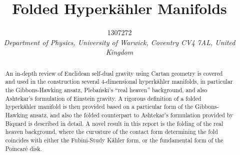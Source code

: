 \documentclass[a4paper,12pt, onecolumn, notitlepage]{article}
\theoremstyle{definition}
\theoremstyle{remark}
\newcommand{\K}{K\"ahler }
\newcommand{\HK}{hyperk\"ahler }
\begin{document}
\title{\textbf{\large{Folded Hyperk\"ahler Manifolds}}}
	
\author{\normalsize{1307272} \\
	\small\textit{
		Department of Physics, University of Warwick,
		Coventry CV4 7AL, United Kingdom}}
\date{}
\maketitle 
\vspace{-10mm}
\begin{abstract} 
\noindent
An in-depth review of Euclidean self-dual gravity using Cartan geometry is covered and used in the construction several 4-dimensional \HK manifolds, in particular the Gibbons-Hawking ansatz, Pleba\'nski's ``real heaven'' background, and also Ashtekar's formulation of Einstein gravity.
A rigorous definition of a folded \HK manifold is then provided based on a particular form of the Gibbons-Hawking ansatz, and also the folded counterpart to Ashtekar's formulation provided by Biquard is described in detail. A novel result in this report is the folding of the real heaven background, where the curvature of the contact form determining the fold coincides with either the Fubini-Study \K form, or the fundamental form of the Poincar\'e disk.
\end{abstract}
\vspace{11mm}	
	
\end{document}
